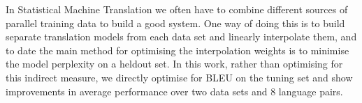 In Statistical Machine Translation  we often have to combine different sources of parallel training data
 to build a good system. One way of doing
 this is to build separate translation models from each data set and linearly
 interpolate
 them, and to
 date the main method for optimising the interpolation weights is to minimise
 the model
 perplexity
 on a heldout set. In this work, rather than optimising for this indirect
 measure, we directly
 optimise for BLEU on the tuning set and show improvements in average
 performance  over
  two data sets and
 8 language pairs.

